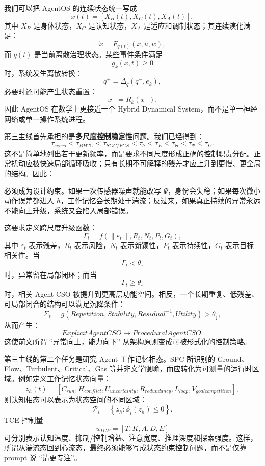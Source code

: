 我们可以把 AgentOS 的连续状态统一写成
\[
x(t)
=
\left[
X_B(t),
X_C(t),
X_A(t)
\right],
\]
其中 $X_B$ 是身体状态，$X_C$ 是认知状态，$X_A$ 是适应和调制状态；其连续演化满足：
\[
\dot x
=
F_{q(t)}
\left(
x,u,w
\right),
\]
而 $q(t)$ 是当前离散治理状态。某些事件条件满足
\[
g_k(x,t)\geq 0
\]
时，系统发生离散转换：
\[
q^+
=
\Delta_q(q^-,e_k),
\]
必要时还可能产生状态重置：
\[
x^+
=
R_k(x^-).
\]
因此 AgentOS 在数学上更接近一个 Hybrid Dynamical System，而不是单一神经网络或单一操作系统进程。

第三主线首先承担的是\textbf{多尺度控制稳定性}问题。我们已经得到：
\[
\tau_{servo}
<
\tau_{BPCC}
<
\tau_{SGC/FCS}
<
\tau_h
<
\tau_E
<
\tau_\Theta
<
\tau_\Psi
<
\tau_\Omega .
\]
这不是简单地列出若干更新频率，而是要求不同尺度形成正确的控制职责分配。正常扰动应被快速局部循环吸收；只有长期不可解释的残差才应上升到更慢、更全局的结构。因此：
\begin{statementbox}
\centering
{}
\end{statementbox}
必须成为设计约束。如果一次传感器噪声就能改写 $\Psi$，身份会失稳；如果每次微小动作误差都进入 $h$，工作记忆会长期处于湍流；反过来，如果真正持续的异常永远不能向上升级，系统又会陷入局部错误。

这要求定义跨尺度升级函数：
\[
\Gamma_t
=
f
\left(
\|\varepsilon_t\|,
R_t,
N_t,
P_t,
G_t
\right),
\]
其中 $\varepsilon_t$ 表示残差，$R_t$ 表示风险，$N_t$ 表示新颖性，$P_t$ 表示持续性，$G_t$ 表示目标相关性。当
\[
\Gamma_t<\theta_{\uparrow}
\]
时，异常留在局部闭环；而当
\[
\Gamma_t\geq\theta_{\uparrow}
\]
时，相关 Agent-CSO 被提升到更高层功能空间。相反，一个长期重复、低残差、可局部闭合的结构可以满足沉降条件：
\[
\Sigma_t
=
g
\left(
Repetition,
Stability,
Residual^{-1},
Utility
\right)
>
\theta_{\downarrow},
\]
从而产生：
\[
ExplicitAgentCSO
\rightarrow
ProceduralAgentCSO.
\]
这使前文所谓 ``异常向上，能力向下'' 从架构原则变成可被形式化的控制策略。

第三主线的第二个任务是研究 Agent 工作记忆相态。SPC 所识别的 Ground、Flow、Turbulent、Critical、Gas 等并非文学隐喻，而应转化为可测量的运行时区域。例如定义工作记忆状态向量：
\[
z_h(t)
=
\left[
C_{run},
H_{conflict},
U_{uncertainty},
R_{redundancy},
L_{loop},
V_{goalcompetition}
\right],
\]
则认知相态可以表示为状态空间的不同区域：
\[
\mathcal P_i
=
\left\{
z_h:
\phi_i(z_h)\leq 0
\right\}.
\]
TCE 控制量
\[
u_{TCE}
=
\left[
T,
K,
A,
D,
E
\right]
\]
可分别表示认知温度、抑制/控制增益、注意宽度、推理深度和探索强度。这样，所谓从湍流态回到心流态，最终必须能够写成状态约束控制问题，而不是仅靠 prompt 说 ``请更专注''。

